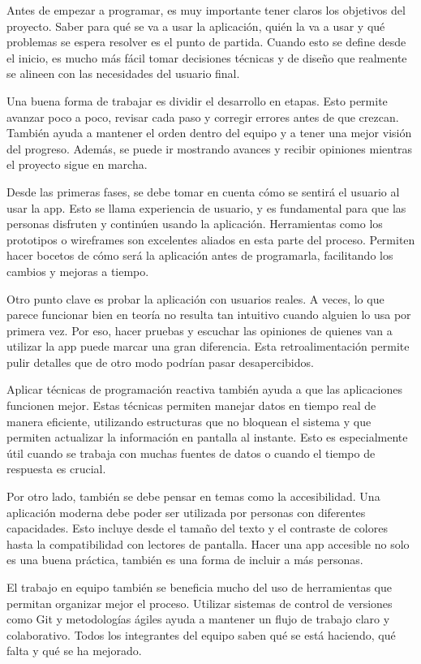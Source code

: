 \documentclass[12pt,letterpaper]{article}
\begin{document}
Antes de empezar a programar, es muy importante tener claros los objetivos del proyecto. Saber para qué se va a usar la aplicación, quién la va a usar y qué problemas se espera resolver es el punto de partida. Cuando esto se define desde el inicio, es mucho más fácil tomar decisiones técnicas y de diseño que realmente se alineen con las necesidades del usuario final.

Una buena forma de trabajar es dividir el desarrollo en etapas. Esto permite avanzar poco a poco, revisar cada paso y corregir errores antes de que crezcan. También ayuda a mantener el orden dentro del equipo y a tener una mejor visión del progreso. Además, se puede ir mostrando avances y recibir opiniones mientras el proyecto sigue en marcha.

Desde las primeras fases, se debe tomar en cuenta cómo se sentirá el usuario al usar la app. Esto se llama experiencia de usuario, y es fundamental para que las personas disfruten y continúen usando la aplicación. Herramientas como los prototipos o wireframes son excelentes aliados en esta parte del proceso. Permiten hacer bocetos de cómo será la aplicación antes de programarla, facilitando los cambios y mejoras a tiempo.

Otro punto clave es probar la aplicación con usuarios reales. A veces, lo que parece funcionar bien en teoría no resulta tan intuitivo cuando alguien lo usa por primera vez. Por eso, hacer pruebas y escuchar las opiniones de quienes van a utilizar la app puede marcar una gran diferencia. Esta retroalimentación permite pulir detalles que de otro modo podrían pasar desapercibidos.

Aplicar técnicas de programación reactiva también ayuda a que las aplicaciones funcionen mejor. Estas técnicas permiten manejar datos en tiempo real de manera eficiente, utilizando estructuras que no bloquean el sistema y que permiten actualizar la información en pantalla al instante. Esto es especialmente útil cuando se trabaja con muchas fuentes de datos o cuando el tiempo de respuesta es crucial.

Por otro lado, también se debe pensar en temas como la accesibilidad. Una aplicación moderna debe poder ser utilizada por personas con diferentes capacidades. Esto incluye desde el tamaño del texto y el contraste de colores hasta la compatibilidad con lectores de pantalla. Hacer una app accesible no solo es una buena práctica, también es una forma de incluir a más personas.

El trabajo en equipo también se beneficia mucho del uso de herramientas que permitan organizar mejor el proceso. Utilizar sistemas de control de versiones como Git y metodologías ágiles ayuda a mantener un flujo de trabajo claro y colaborativo. Todos los integrantes del equipo saben qué se está haciendo, qué falta y qué se ha mejorado.
\end{document}
